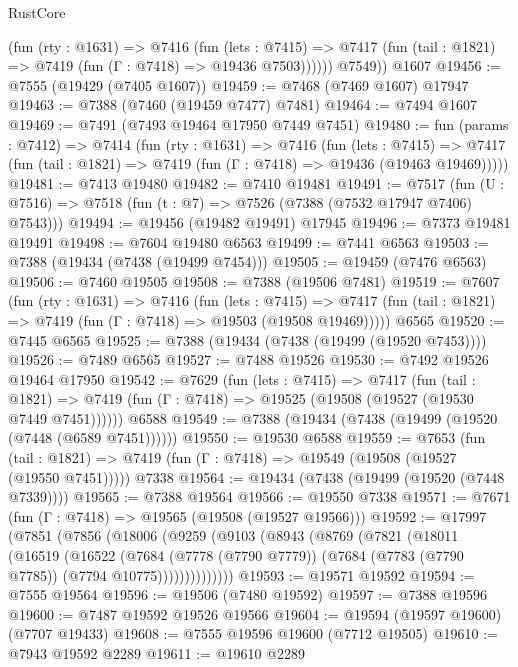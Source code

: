 \begin{lexlean}{RustCore}
\begin{coremodule}
            (fun (rty : @1631) =>
            @7416
              (fun (lets : @7415) =>
              @7417 (fun (tail : @1821) => @7419 (fun (Γ : @7418) => @19436 @7503))))))
        @7549))
    @1607
@19456 := @7555 (@19429 (@7405 @1607))
@19459 := @7468 (@7469 @1607) @17947
@19463 := @7388 (@7460 (@19459 @7477) @7481)
@19464 := @7494 @1607
@19469 := @7491 (@7493 @19464 @17950 @7449 @7451)
@19480 := fun (params : @7412) =>
  @7414
    (fun (rty : @1631) =>
    @7416
      (fun (lets : @7415) =>
      @7417 (fun (tail : @1821) => @7419 (fun (Γ : @7418) => @19436 (@19463 @19469)))))
@19481 := @7413 @19480
@19482 := @7410 @19481
@19491 := @7517
    (fun (U : @7516) => @7518 (fun (t : @7) => @7526 (@7388 (@7532 @17947 @7406) @7543)))
@19494 := @19456 (@19482 @19491) @17945
@19496 := @7373 @19481 @19491
@19498 := @7604 @19480 @6563
@19499 := @7441 @6563
@19503 := @7388 (@19434 (@7438 (@19499 @7454)))
@19505 := @19459 (@7476 @6563)
@19506 := @7460 @19505
@19508 := @7388 (@19506 @7481)
@19519 := @7607
    (fun (rty : @1631) =>
    @7416
      (fun (lets : @7415) =>
      @7417 (fun (tail : @1821) => @7419 (fun (Γ : @7418) => @19503 (@19508 @19469)))))
    @6565
@19520 := @7445 @6565
@19525 := @7388 (@19434 (@7438 (@19499 (@19520 @7453))))
@19526 := @7489 @6565
@19527 := @7488 @19526
@19530 := @7492 @19526 @19464 @17950
@19542 := @7629
    (fun (lets : @7415) =>
    @7417
      (fun (tail : @1821) =>
      @7419 (fun (Γ : @7418) => @19525 (@19508 (@19527 (@19530 @7449 @7451))))))
    @6588
@19549 := @7388 (@19434 (@7438 (@19499 (@19520 (@7448 (@6589 @7451))))))
@19550 := @19530 @6588
@19559 := @7653
    (fun (tail : @1821) => @7419 (fun (Γ : @7418) => @19549 (@19508 (@19527 (@19550 @7451)))))
    @7338
@19564 := @19434 (@7438 (@19499 (@19520 (@7448 @7339))))
@19565 := @7388 @19564
@19566 := @19550 @7338
@19571 := @7671 (fun (Γ : @7418) => @19565 (@19508 (@19527 @19566)))
@19592 := @17997
    (@7851
      (@7856
        (@18006
          (@9259
            (@9103
              (@8943
                (@8769
                  (@7821
                    (@18011
                      (@16519
                        (@16522
                          (@7684
                            (@7778 (@7790 @7779))
                            (@7684 (@7783 (@7790 @7785)) (@7794 @10775))))))))))))))
@19593 := @19571 @19592
@19594 := @7555 @19564
@19596 := @19506 (@7480 @19592)
@19597 := @7388 @19596
@19600 := @7487 @19592 @19526 @19566
@19604 := @19594 (@19597 @19600) (@7707 @19433)
@19608 := @7555 @19596 @19600 (@7712 @19505)
@19610 := @7943 @19592 @2289
@19611 := @19610 @2289

\end{coremodule}
\end{lexlean}

